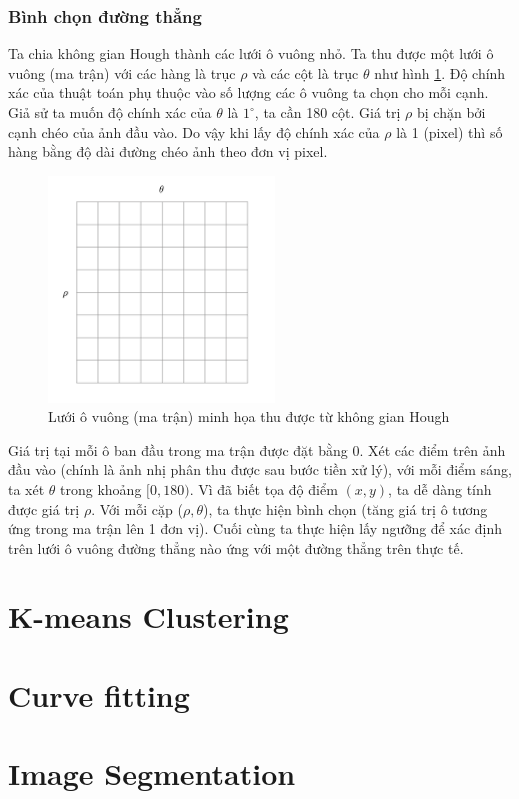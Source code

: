 \subsubsection{Bình chọn đường thẳng}
\tab Ta chia không gian Hough thành các lưới ô vuông nhỏ. Ta thu được một lưới ô vuông (ma trận) với các hàng là trục $\rho$ và các cột là trục $\theta$ như hình \ref{accumlator}. Độ chính xác của thuật toán phụ thuộc vào số lượng các ô vuông ta chọn cho mỗi cạnh. Giả sử ta muốn độ chính xác của $\theta$ là $1^{\circ}$, ta cần 180 cột. Giá trị $\rho$ bị chặn bởi cạnh chéo của ảnh đầu vào. Do vậy khi lấy độ chính xác của $\rho$ là 1 (pixel) thì số hàng bằng độ dài đường chéo ảnh theo đơn vị pixel.\\
\begin{figure}[ht]
\begin{center}
    \includegraphics[width=6cm]{img/2_Theory/hough_trans_2.png}
    \caption{Lưới ô vuông (ma trận) minh họa thu được từ không gian Hough}
    \label{accumlator}
\end{center}
\end{figure}
\newpage
\tab Giá trị tại mỗi ô ban đầu trong ma trận được đặt bằng 0. Xét các điểm trên ảnh đầu vào (chính là ảnh nhị phân thu được sau bước tiền xử lý), với mỗi điểm sáng, ta xét $\theta$ trong khoảng $[0, 180)$. Vì đã biết tọa độ điểm $(x, y)$, ta dễ dàng tính được giá trị $\rho$. Với mỗi cặp ($\rho, \theta$), ta thực hiện bình chọn (tăng giá trị ô tương ứng trong ma trận lên 1 đơn vị). Cuối cùng ta thực hiện lấy ngưỡng để xác định trên lưới ô vuông đường thẳng nào ứng với một đường thẳng trên thực tế.
\section{K-means Clustering}
\section{Curve fitting}
\section{Image Segmentation}
